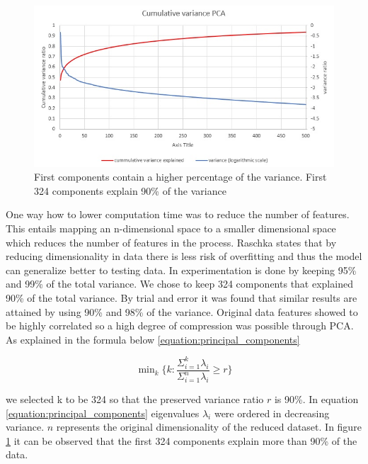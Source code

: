 \documentclass[12pt, a4paper]{report}
\theoremstyle{definition}
\theoremstyle{definition}%
\theoremstyle{definition}%
\theoremstyle{definition}%
\theoremstyle{definition}%
\theoremstyle{definition}%
\begin{document}
\begin{figure}[h]	
	\includegraphics[scale=0.50]{cumulative_variance_pca.jpg}
	\centering
	\caption[PCA first k components cumulative variance]{First components contain a higher percentage of the variance. First 324 components explain 90\% of the variance }
	\label{fig:cumulative_variance_pca}
\end{figure}

One way how to lower computation time was to reduce the number of features. This entails mapping an n-dimensional space to a smaller dimensional space which reduces the number of features in the process. Raschka  \cite{raschka2015python} states that by reducing dimensionality in data there is less risk of overfitting and thus the model can generalize better to testing data.  In \cite{Yang2004} experimentation is done by keeping 95\% and 99\% of the total variance. We chose to keep 324 components that explained 90\% of the total variance. By trial and error it was found that similar results are attained by using 90\% and 98\% of the variance. Original data features showed to be highly correlated so a high degree of compression was possible through PCA. As explained in the formula below \ref{equation:principal_components}


\begin{equation} \label{equation:principal_components}
 \mathop{\text{min}}_k \Bigg\{ k : \frac{{\Sigma }_{i=1}^{k} \lambda_i}{{\Sigma }_{i=1}^{n}\lambda_i} \geq r \Bigg\}
\end{equation}

we selected k to be 324 so that the preserved variance ratio $r$ is 90\%. In equation \ref{equation:principal_components} eigenvalues $\lambda_i$ were ordered in decreasing variance. $n$ represents the original dimensionality of the reduced dataset. In figure \ref{fig:cumulative_variance_pca} it can be observed that the first 324 components explain more than 90\% of the data.
\end{document}

